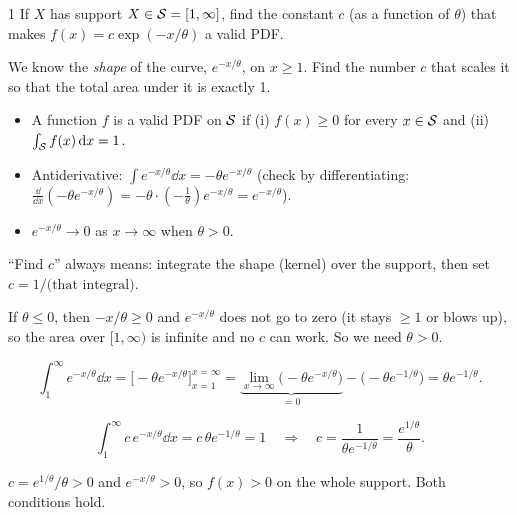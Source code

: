 \documentclass[11pt]{article}
\begin{document}
\begin{problem}{1}
If $X$ has support $X\in\mathcal{S}=[1,\infty]$, find the constant $c$ (as a function of $\theta$) that makes $f(x)=c\exp(-x/\theta)$ a valid PDF.
\end{problem}

\begin{restate}
We know the \emph{shape} of the curve, $e^{-x/\theta}$, on $x\ge1$. Find the number $c$ that scales it so that the total area under it is exactly 1.
\end{restate}

\begin{recall}
\begin{itemize}
\item A function $f$ is a valid PDF on $\mathcal{S}$ if (i) $f(x)\ge0$ for every $x\in\mathcal{S}$ and (ii) $\int_{\mathcal{S}}f(x)\,\mathrm{d} x=1$.
\item Antiderivative: $\int e^{-x/\theta}\dd x=-\theta e^{-x/\theta}$ (check by differentiating: $\frac{\dd}{\dd x}(-\theta e^{-x/\theta})=-\theta\cdot(-\frac1\theta)e^{-x/\theta}=e^{-x/\theta}$).
\item $e^{-x/\theta}\to0$ as $x\to\infty$ when $\theta>0$.
\end{itemize}
\end{recall}

\begin{keyidea}
``Find $c$'' always means: integrate the shape (kernel) over the support, then set $c=1/\text{(that integral)}$.
\end{keyidea}

\solution
{}
If $\theta\le0$, then $-x/\theta\ge0$ and $e^{-x/\theta}$ does not go to zero (it stays $\ge1$ or blows up), so the area over $[1,\infty)$ is infinite and no $c$ can work. So we need $\theta>0$.

\[
\int_1^\infty e^{-x/\theta}\dd x=\Big[-\theta e^{-x/\theta}\Big]_{x=1}^{x=\infty}
=\underbrace{\lim_{x\to\infty}\big(-\theta e^{-x/\theta}\big)}_{=0}-\big(-\theta e^{-1/\theta}\big)=\theta e^{-1/\theta}.
\]

\[
\int_1^\infty c\,e^{-x/\theta}\dd x=c\,\theta e^{-1/\theta}=1\quad\Longrightarrow\quad c=\frac{1}{\theta e^{-1/\theta}}=\frac{e^{1/\theta}}{\theta}.
\]

$c=e^{1/\theta}/\theta>0$ and $e^{-x/\theta}>0$, so $f(x)>0$ on the whole support. Both conditions hold.
\end{document}
